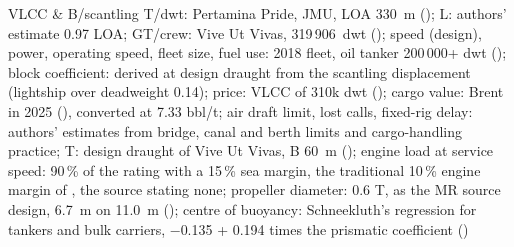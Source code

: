 VLCC & B/scantling T/dwt: Pertamina Pride, JMU, LOA 330~m (\citealp{baird2021pertaminapride}); L: authors' estimate 0.97 LOA; GT/crew: Vive Ut Vivas, 319\,906~dwt (\citealp{baird2026_vive_ut_vivas}); speed (design), power, operating speed, fleet size, fuel use: 2018 fleet, oil tanker 200\,000+ dwt (\citealp[Table 35]{faber2020}); block coefficient: derived at design draught from the scantling displacement (lightship over deadweight 0.14); price: VLCC of 310k dwt (\citealp[pp. 7 and 16]{allied2026}); cargo value: Brent in 2025 (\citealp{worldbank2026}), converted at 7.33 bbl/t; air draft limit, lost calls, fixed-rig delay: authors' estimates from bridge, canal and berth limits and cargo-handling practice; T: design draught of Vive Ut Vivas, B 60~m (\citealp{baird2026_vive_ut_vivas}); engine load at service speed: 90\,\% of the rating with a 15\,\% sea margin, the traditional 10\,\% engine margin of \citet{man2011}, the source stating none; propeller diameter: 0.6 T, as the MR source design, 6.7~m on 11.0~m (\citealp[Tables 1-2]{man2019mr}); centre of buoyancy: Schneekluth's regression for tankers and bulk carriers, \ensuremath{-}0.135 + 0.194 times the prismatic coefficient (\citealp[slide 16]{ventura_estimation}) \\

